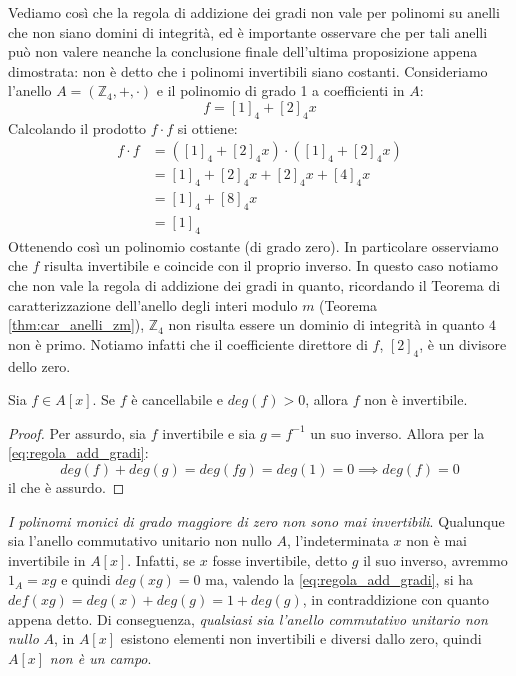 \begin{example}
	Vediamo così che la regola di addizione dei gradi non vale per polinomi su anelli che non siano domini di integrità, ed è importante osservare che per tali anelli può non valere neanche la conclusione finale dell'ultima proposizione appena dimostrata: non è detto che i polinomi invertibili siano costanti. Consideriamo l'anello $A=(\mathbb{Z}_{4},+,\cdot)$ e il polinomio di grado 1 a coefficienti in $A$:
	\begin{displaymath}
		f= [1]_{4} + [2]_{4}x
	\end{displaymath}
	Calcolando il prodotto $f \cdot f$ si ottiene:
	\begin{align*}
		f \cdot f &= ([1]_{4} + [2]_{4}x) \cdot ([1]_{4} + [2]_{4}x) \\
		&= [1]_{4} +[2]_{4}x+[2]_{4}x +[4]_{4}x \\
		&= [1]_{4} + [8]_{4}x \\
		&= [1]_{4}
	\end{align*}
	Ottenendo così un polinomio costante (di grado zero). In particolare osserviamo che $f$ risulta invertibile e coincide con il proprio inverso. In questo caso notiamo che non vale la regola di addizione dei gradi in quanto, ricordando il Teorema di caratterizzazione dell'anello degli interi modulo $m$ (Teorema \ref{thm:car_anelli_zm}), $\mathbb{Z}_{4}$ non risulta essere un dominio di integrità in quanto $4$ non è primo. Notiamo infatti che il coefficiente direttore di $f$, $[2]_{4}$, è un divisore dello zero.
	
\end{example}

\begin{propbox}
	Sia $f \in A[x]$. Se $f$ è cancellabile e $deg(f)>0$, allora $f$ non è invertibile.
	
\end{propbox}

\begin{proof}
	Per assurdo, sia $f$ invertibile e sia $g=f^{-1}$ un suo inverso. Allora per la \ref{eq:regola_add_gradi}:
	\[deg(f)+deg(g)=deg(fg)=deg(1)=0 \implies deg(f)=0\]
	il che è assurdo. 
\end{proof}


\begin{example}
	\textit{I polinomi monici di grado maggiore di zero non sono mai invertibili}. Qualunque sia l'anello commutativo unitario non nullo $A$, l'indeterminata $x$ non è mai invertibile in $A[x]$. Infatti, se $x$ fosse invertibile, detto $g$ il suo inverso, avremmo $1_{A} = xg$ e quindi $deg(xg)=0$ ma, valendo la \ref{eq:regola_add_gradi}, si ha $def(xg)=deg(x)+deg(g)=1+deg(g)$, in contraddizione con quanto appena detto. Di conseguenza, \textit{qualsiasi sia l'anello commutativo unitario non nullo} $A$, in $A[x]$ esistono elementi non invertibili e diversi dallo zero, quindi $A[x]$ \textit{non è un campo}.
\end{example}


